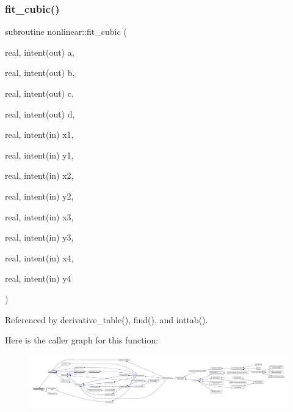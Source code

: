 \subsubsection{\texorpdfstring{fit\+\_\+cubic()}{fit\_cubic()}}
{\footnotesize\ttfamily subroutine nonlinear\+::fit\+\_\+cubic (\begin{DoxyParamCaption}\item[{real, intent(out)}]{a,  }\item[{real, intent(out)}]{b,  }\item[{real, intent(out)}]{c,  }\item[{real, intent(out)}]{d,  }\item[{real, intent(in)}]{x1,  }\item[{real, intent(in)}]{y1,  }\item[{real, intent(in)}]{x2,  }\item[{real, intent(in)}]{y2,  }\item[{real, intent(in)}]{x3,  }\item[{real, intent(in)}]{y3,  }\item[{real, intent(in)}]{x4,  }\item[{real, intent(in)}]{y4 }\end{DoxyParamCaption})\hspace{0.3cm}{\ttfamily [private]}}



Referenced by derivative\+\_\+table(), find(), and inttab().

Here is the caller graph for this function\+:
\nopagebreak
\begin{figure}[H]
\begin{center}
\leavevmode
\includegraphics[width=350pt]{namespacenonlinear_ad34b8f5e3284fe90bf1e2d39ad027cc1_icgraph}
\end{center}
\end{figure}
\mbox{\label{namespacenonlinear_a5754454991f9dfb61c4251267c2d175d}} 

